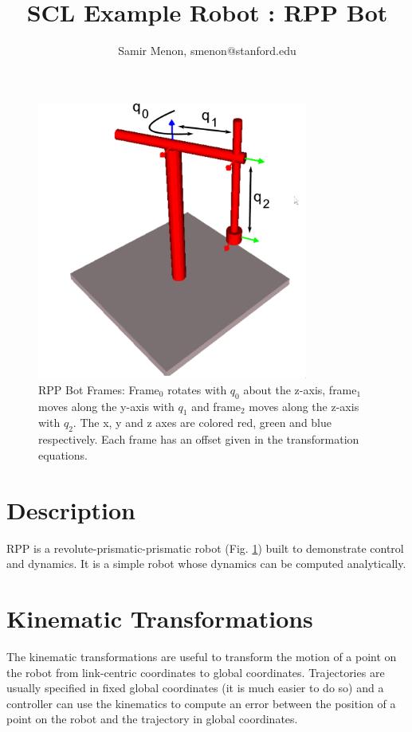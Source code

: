 \documentclass[12pt]{article}
\title{SCL Example Robot : RPP Bot}
\author{Samir Menon, smenon@stanford.edu}
\begin{document}
\maketitle


\begin{figure}[ht!]
\begin{center}
\includegraphics[width=3.5in]{figs/rpp2.pdf}
\caption{RPP Bot Frames: Frame$_0$ rotates with $q_0$ about the z-axis, frame$_1$ moves along the y-axis 
with $q_1$ and frame$_2$ moves along the z-axis with $q_2$. The x, y and z axes are colored red, green 
and blue respectively. Each frame has an offset given in the transformation equations.}
\label{fig:rppframes}
\end{center}
\end{figure}


\section{Description}
RPP is a revolute-prismatic-prismatic robot (Fig. \ref{fig:rppframes}) built to
demonstrate control and dynamics. It is a simple robot whose dynamics can be
computed analytically.

\section{Kinematic Transformations}
The kinematic transformations are useful to transform the motion of a point on the robot
from link-centric coordinates to global coordinates. Trajectories are usually specified in
fixed global coordinates (it is much easier to do so) and a controller can use the kinematics to
compute an error between the position of a point on the robot and the trajectory in global
coordinates.
\end{document}
